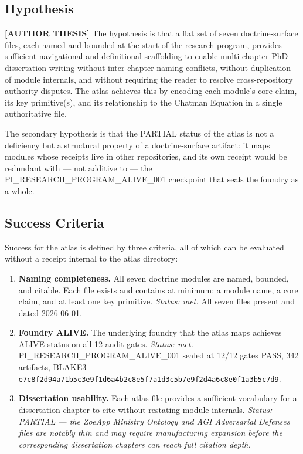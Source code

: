 \subsection{Hypothesis}
\label{sec:atlas-rq-hypothesis}

\textbf{[AUTHOR THESIS]} The hypothesis is that a flat set of seven
doctrine-surface files, each named and bounded at the start of the research
program, provides sufficient navigational and definitional scaffolding to enable
multi-chapter PhD dissertation writing without inter-chapter naming conflicts,
without duplication of module internals, and without requiring the reader to
resolve cross-repository authority disputes. The atlas achieves this by encoding
each module's core claim, its key primitive(s), and its relationship to the
Chatman Equation in a single authoritative file.

The secondary hypothesis is that the PARTIAL status of the atlas is not a
deficiency but a structural property of a doctrine-surface artifact: it maps
modules whose receipts live in other repositories, and its own receipt would be
redundant with --- not additive to --- the PI\_RESEARCH\_PROGRAM\_ALIVE\_001
checkpoint that seals the foundry as a whole.

\subsection{Success Criteria}
\label{sec:atlas-rq-success}

Success for the atlas is defined by three criteria, all of which can be
evaluated without a receipt internal to the atlas directory:

\begin{enumerate}
  \item \textbf{Naming completeness.} All seven doctrine modules are named,
        bounded, and citable. Each file exists and contains at minimum: a module
        name, a core claim, and at least one key primitive. \textit{Status:
        met.} All seven files present and dated 2026-06-01.

  \item \textbf{Foundry ALIVE.} The underlying foundry that the atlas maps
        achieves ALIVE status on all 12 audit gates. \textit{Status: met.}
        PI\_RESEARCH\_PROGRAM\_ALIVE\_001 sealed at 12/12 gates PASS, 342
        artifacts, BLAKE3 \texttt{e7c8f2d94a71b5c3e9f1d6a4b2c8e5f7a1d3c5b7e9f2d4a6c8e0f1a3b5c7d9}.

  \item \textbf{Dissertation usability.} Each atlas file provides a sufficient
        vocabulary for a dissertation chapter to cite without restating module
        internals. \textit{Status: PARTIAL --- the ZoeApp Ministry Ontology and
        AGI Adversarial Defenses files are notably thin and may require
        manufacturing expansion before the corresponding dissertation chapters
        can reach full citation depth.}
\end{enumerate}
